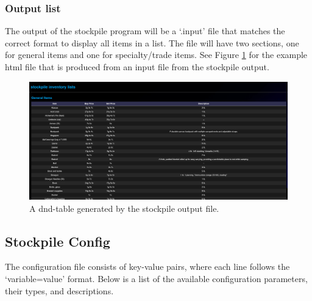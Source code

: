 \subsubsection{Output list}

The output of the stockpile program will be a `.input' file that matches the correct format to display all items in a list. The file will have two sections, one for general items and one for specialty/trade items. See Figure \ref{fig:stockpile_general_list} for the example html file that is produced from an input file from the stockpile output.

\begin{figure}[h]
	\centering
	\includegraphics[width=\textwidth]{images/stockpile_general.png}
	\caption{A dnd-table generated by the stockpile output file.}
	\label{fig:stockpile_general_list}
\end{figure}

\subsection{Stockpile Config\label{stockpile config}}

The configuration file consists of key-value pairs, where each line follows the `variable=value' format. Below is a list of the available configuration parameters, their types, and descriptions.

